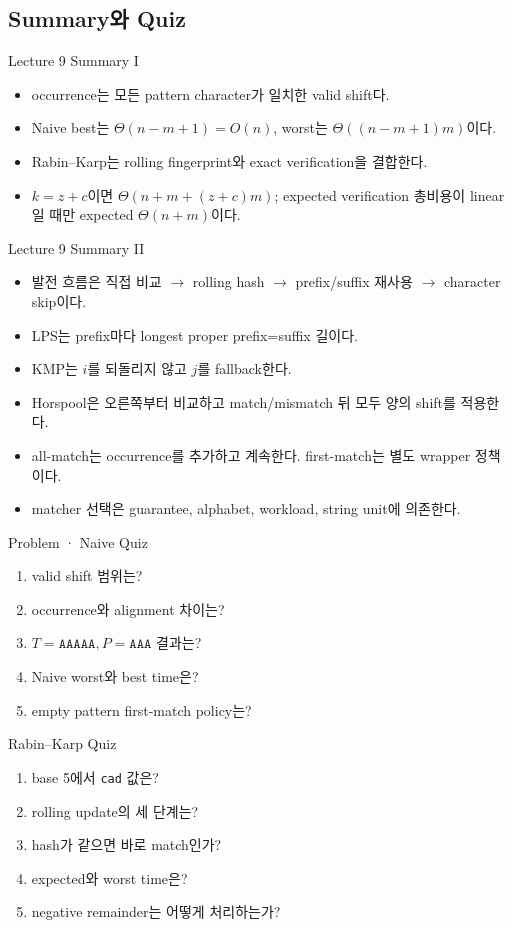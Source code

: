 \subsection{Summary와 Quiz}
\begin{frame}{Lecture 9 Summary I}
\begin{itemize}\item occurrence는 모든 pattern character가 일치한 valid shift다.\item Naive best는 \(\Theta(n-m+1)=O(n)\), worst는 \(\Theta((n-m+1)m)\)이다.\item Rabin--Karp는 rolling fingerprint와 exact verification을 결합한다.\item \(k=z+c\)이면 \(\Theta(n+m+(z+c)m)\); expected verification 총비용이 linear일 때만 expected \(\Theta(n+m)\)이다.\end{itemize}
\end{frame}
\begin{frame}{Lecture 9 Summary II}
\begin{itemize}\item 발전 흐름은 직접 비교 \(\rightarrow\) rolling hash \(\rightarrow\) prefix/suffix 재사용 \(\rightarrow\) character skip이다.\item LPS는 prefix마다 longest proper prefix=suffix 길이다.\item KMP는 \(i\)를 되돌리지 않고 \(j\)를 fallback한다.\item Horspool은 오른쪽부터 비교하고 match/mismatch 뒤 모두 양의 shift를 적용한다.\item all-match는 occurrence를 추가하고 계속한다. first-match는 별도 wrapper 정책이다.\item matcher 선택은 guarantee, alphabet, workload, string unit에 의존한다.\end{itemize}
\end{frame}
\begin{frame}{Problem · Naive Quiz}
\small\begin{enumerate}\item valid shift 범위는?\item occurrence와 alignment 차이는?\item \(T=\texttt{AAAAA},P=\texttt{AAA}\) 결과는?\item Naive worst와 best time은?\item empty pattern first-match policy는?\end{enumerate}
\end{frame}
\begin{frame}{Rabin--Karp Quiz}
\small\begin{enumerate}\item base 5에서 \texttt{cad} 값은?\item rolling update의 세 단계는?\item hash가 같으면 바로 match인가?\item expected와 worst time은?\item negative remainder는 어떻게 처리하는가?\end{enumerate}
\end{frame}
